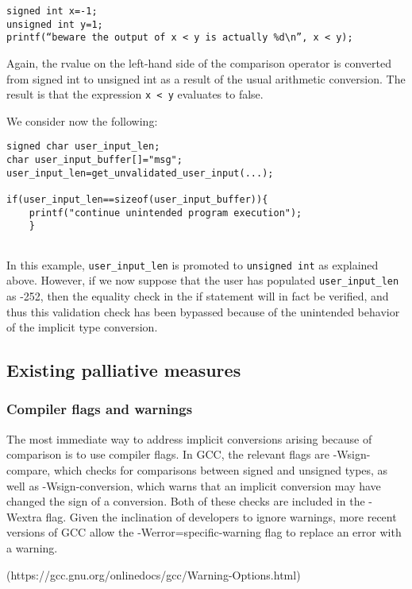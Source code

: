 \documentclass[11pt,letterpaper]{article}
\begin{document}
\begin{lstlisting}[style=CStyle]
signed int x=-1;
unsigned int y=1;
printf(“beware the output of x < y is actually %d\n”, x < y);
\end{lstlisting}

Again, the rvalue on the left-hand side of the comparison operator is converted from signed int to unsigned int as a result of the usual arithmetic conversion.
The result is that the expression \texttt{x < y} evaluates to false.

We consider now the following:

\begin{lstlisting}[style=CStyle]
signed char user_input_len;
char user_input_buffer[]="msg";
user_input_len=get_unvalidated_user_input(...);

if(user_input_len==sizeof(user_input_buffer)){
	printf("continue unintended program execution");
	}	
 	
\end{lstlisting}

In this example,  \texttt{user\_input\_len} is promoted to \texttt{unsigned int} as explained above. However, if we now suppose that the user has populated \texttt{user\_input\_len} as -252, then the equality check in the if statement will in fact be verified, and thus this validation check has been bypassed because of the unintended behavior of the implicit type conversion. 


\subsection{Existing palliative measures}

\subsubsection{Compiler flags and warnings}
The most immediate way to address implicit conversions arising because of comparison is to use compiler flags. In GCC, the relevant flags are -Wsign-compare, which checks for comparisons between signed and unsigned types, as well as -Wsign-conversion, which warns that an implicit conversion may have changed the sign of a conversion. Both of these checks are included in the -Wextra flag. Given the inclination of developers to ignore warnings, more recent versions of GCC allow the -Werror=specific-warning flag to replace an error with a warning.

(https://gcc.gnu.org/onlinedocs/gcc/Warning-Options.html)
\end{document}
